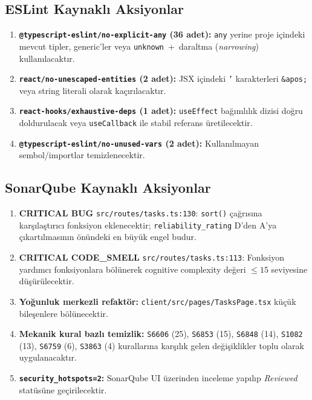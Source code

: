 \documentclass[conference]{IEEEtran}
\begin{document}
\subsection{ESLint Kaynaklı Aksiyonlar}
\begin{enumerate}
\item \textbf{\texttt{@typescript-eslint/no-explicit-any} (36 adet):}
  \texttt{any} yerine proje içindeki mevcut tipler, generic'ler veya
  \texttt{unknown}~+~daraltma (\emph{narrowing}) kullanılacaktır.
\item \textbf{\texttt{react/no-unescaped-entities} (2 adet):}
  JSX içindeki \texttt{'} karakterleri \texttt{\&apos;} veya string
  literali olarak kaçırılacaktır.
\item \textbf{\texttt{react-hooks/exhaustive-deps} (1 adet):}
  \texttt{useEffect} bağımlılık dizisi doğru doldurulacak veya
  \texttt{useCallback} ile stabil referans üretilecektir.
\item \textbf{\texttt{@typescript-eslint/no-unused-vars} (2 adet):}
  Kullanılmayan sembol/importlar temizlenecektir.
\end{enumerate}

\subsection{SonarQube Kaynaklı Aksiyonlar}
\begin{enumerate}
\item \textbf{CRITICAL BUG} \texttt{src/routes/tasks.ts:130}:
  \texttt{sort()} çağrısına karşılaştırıcı fonksiyon eklenecektir;
  \texttt{reliability\_rating} D'den A'ya çıkartılmasının önündeki en
  büyük engel budur.
\item \textbf{CRITICAL CODE\_SMELL} \texttt{src/routes/tasks.ts:113}:
  Fonksiyon yardımcı fonksiyonlara bölünerek cognitive complexity
  değeri $\leq 15$ seviyesine düşürülecektir.
\item \textbf{Yoğunluk merkezli refaktör:}
  \texttt{client/src/pages/TasksPage.tsx} küçük bileşenlere bölünecektir.
\item \textbf{Mekanik kural bazlı temizlik:}
  \texttt{S6606} (25), \texttt{S6853} (15), \texttt{S6848} (14),
  \texttt{S1082} (13), \texttt{S6759} (6), \texttt{S3863} (4) kurallarına
  karşılık gelen değişiklikler toplu olarak uygulanacaktır.
\item \textbf{\texttt{security\_hotspots=2}:} SonarQube UI üzerinden
  inceleme yapılıp \emph{Reviewed} statüsüne geçirilecektir.
\end{enumerate}
\end{document}

